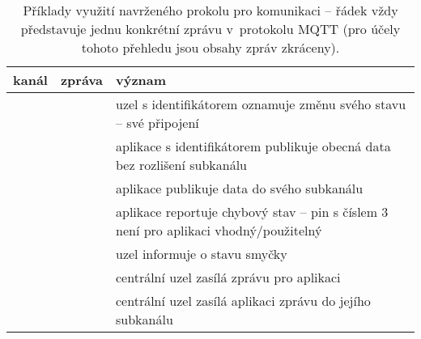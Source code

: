 \begin{table}
    \centering
    \caption{Příklady využití navrženého prokolu pro komunikaci -- řádek vždy představuje jednu konkrétní zprávu
    v~protokolu MQTT (pro účely tohoto přehledu jsou obsahy zpráv zkráceny).}
    \begin{tabularx}{\textwidth}{@{}sls@{}}
        \toprule
        \textbf{kanál} & \textbf{zpráva} & \textbf{význam} \\
        \hline
         &  & uzel s identifikátorem  oznamuje změnu
        svého stavu -- své připojení \\
        \midrule
         &  & aplikace s identifikátorem  publikuje
        obecná data bez rozlišení subkanálu \\
        \midrule
         &  & aplikace publikuje data do svého
        subkanálu  \\
        \midrule
         &  & aplikace reportuje chybový
        stav -- pin s číslem 3 není pro aplikaci vhodný/použitelný \\
        \midrule
         &  & uzel informuje o stavu
        smyčky\footnotemark \\
        \midrule
         &  & centrální uzel zasílá zprávu pro aplikaci
         \\
        \midrule
         &  & centrální uzel zasílá aplikaci
         zprávu do jejího subkanálu  \\
        \bottomrule
    \end{tabularx}
    \label{table:protocol-examples}
\end{table}


